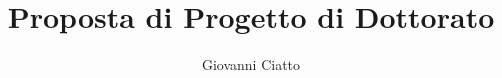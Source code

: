 \documentclass[]{scrartcl}
\title{Proposta di Progetto di Dottorato}
\author{Giovanni Ciatto}
\begin{document}
\maketitle

\begin{abstract}

\end{abstract}


\end{document}
